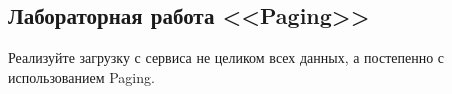 \subsection{Лабораторная работа <<Paging>> }

Реализуйте загрузку с сервиса не целиком всех данных, а постепенно с использованием Paging. 

